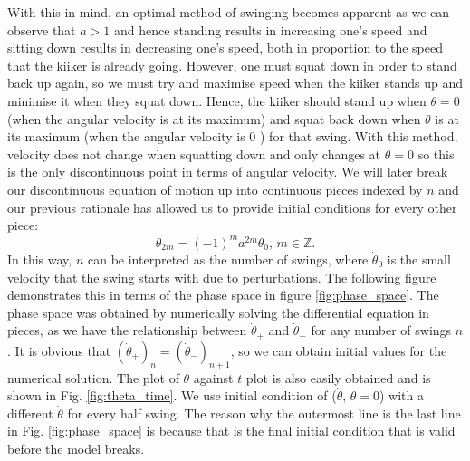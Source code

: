 \documentclass[12pt]{article}
\begin{document}
With this in mind, an optimal method of swinging becomes apparent as we can observe that $a >1$ and hence standing results in increasing one's speed and sitting down results in decreasing one's speed, both in proportion to the speed that the kiiker is already going. However, one must squat down in order to stand back up again, so we must try and maximise speed when the kiiker stands up and minimise it when they squat down. Hence, the kiiker should stand up when $\theta = 0$ (when the angular velocity is at its maximum) and squat back down when $\theta$ is at its maximum (when the angular velocity is 0 ) for that swing. With this method, velocity does not change when squatting down and only changes at $\theta = 0$ so this is the only discontinuous point in terms of angular velocity. We will later break our discontinuous equation of motion up into continuous pieces indexed by $n$ and our previous rationale has allowed us to provide initial conditions for every other piece:
\begin{equation}
    \dot{\theta}_{2m} = (-1)^ma^{2m}\dot{\theta}_0, \, m \in \mathbb{Z}.
\end{equation}
In this way, $n$ can be interpreted as the number of swings, where $\dot{\theta}_0$ is the small velocity that the swing starts with due to perturbations. The following figure demonstrates this in terms of the phase space in figure \ref{fig:phase_space}. The phase space was obtained by numerically solving the differential equation in pieces, as we have the relationship between $\dot\theta_{+}$ and $\dot\theta_{-}$ for any number of swings $n$. It is obvious that $(\dot\theta_{+})_n = (\dot\theta_-)_{n+1}$, so we can obtain initial values for the numerical solution. The plot of $\theta$ against $t$ plot is also easily obtained and is shown in Fig. \ref{fig:theta_time}. We use initial condition of ($\dot\theta$, $\theta = 0$) with a different $\dot\theta$ for every half swing. The reason why the outermost line is the last line in Fig. \ref{fig:phase_space} is because that is the final initial condition that is valid before the model breaks.
\end{document}
